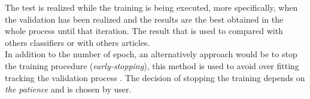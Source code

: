 The test is realized while the training is being executed, more specifically, when the validation has been realized and the results are the best obtained in the whole process until that iteration. The result that is used to compared with others classifiers or with others articles.\\

In addition to the number of epoch, an alternatively approach would be to stop the training procedure (\textit{early-stopping}), this method is used to avoid over fitting tracking the validation process \cite{Yoshua}. The decision of stopping the training depends on \textit{the patience} and is chosen by user.






